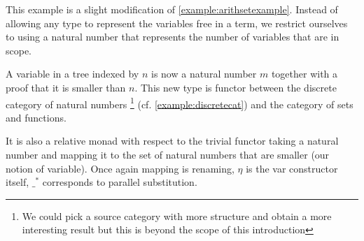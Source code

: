 \begin{example}
\label{example:arithnatexample}

This example is a slight modification of \cref{example:arithsetexample}.
Instead of allowing any type to represent the variables free in a term,
we restrict ourselves to using a natural number that represents the number
of variables that are in scope.

A variable in a tree indexed by $n$ is now a natural number $m$ together
with a proof that it is smaller than $n$. This new type is functor between
the discrete category of natural numbers%
\footnote{We could pick a source category with more structure and
obtain a more interesting result but this is beyond the scope of this
introduction}%
(cf. \cref{example:discretecat}) and the category of sets and functions.

It is also a relative monad with respect to the trivial functor taking
a natural number and mapping it to the set of natural numbers that are
smaller (our notion of variable). Once again mapping is renaming, $η$
is the var constructor itself, $\_^*$ corresponds to parallel substitution.
\end{example}
